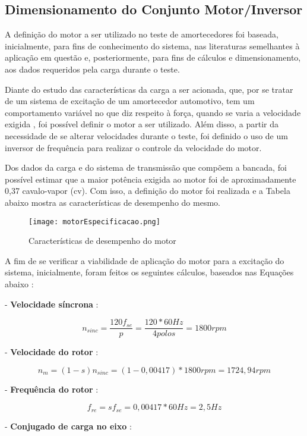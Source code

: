 \subsection{Dimensionamento do Conjunto Motor/Inversor}

	A definição do motor a ser utilizado no teste de amortecedores foi baseada, inicialmente, para fins de conhecimento do sistema, nas literaturas \cite{Duarte}\cite{Vandresen} semelhantes à aplicação em questão e, posteriormente, para fins de cálculos e dimensionamento, aos dados requeridos pela carga durante o teste. 
	
	Diante do estudo das características da carga a ser acionada, que, por se tratar de um sistema de excitação de um amortecedor automotivo, tem um comportamento variável no que diz respeito à força, quando se varia a velocidade exigida \cite{Duarte}, foi possível definir o motor a ser utilizado. Além disso, a partir da necessidade de se alterar velocidades durante o teste, foi definido o uso de um inversor de frequência para realizar o controle da velocidade do motor.
	
	Dos dados da carga e do sistema de transmissão que compõem a bancada, foi possível estimar que a maior potência exigida ao motor foi de aproximadamente 0,37 cavalo-vapor (cv). Com isso, a definição do motor foi realizada e a Tabela abaixo mostra as características de desempenho do mesmo.

	\newpage
	\begin{figure}[!h]
		\centering
		\texttt{[image: motorEspecificacao.png]}
		\caption[Características de desempenho do motor]{Características de desempenho do motor \cite{Voges}}
		\label{motorEspecificacao}
	\end{figure}

	A fim de se verificar a viabilidade de aplicação do motor para a excitação do sistema, inicialmente, foram feitos os seguintes cálculos, baseados nas Equações abaixo \cite{Chapman}:

	- \textbf{Velocidade síncrona} :

	$$ n_{sinc} = \frac{120f_{se}}{p} = \frac{120*60Hz}{4 polos} = 1800rpm $$

	- \textbf{Velocidade do rotor} :

	$$ n_{m} = (1 - s)n_{sinc} = (1 - 0,00417) * 1800rpm = 1724,94rpm $$

	- \textbf{Frequência do rotor} :

	$$ f_{re} = sf_{se} = 0,00417 * 60Hz = 2,5Hz $$

	- \textbf{Conjugado de carga no eixo} :

